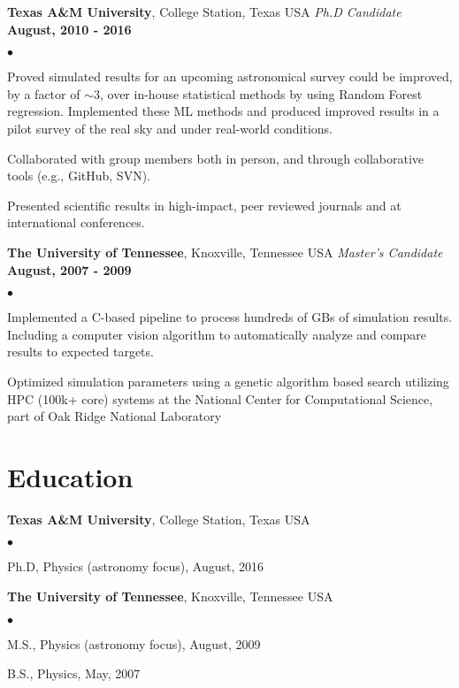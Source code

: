 \documentclass[margin,line, 11pt]{res}
\newenvironment{list2}{
  \begin{list}{$\bullet$}{%
      \setlength{\itemsep}{0in}
      \setlength{\parsep}{0in} \setlength{\parskip}{0in}
      \setlength{\topsep}{0in} \setlength{\partopsep}{0in}
      \setlength{\leftmargin}{0.2in}}}{\end{list}}
\begin{document}
\begin{resume}
\textbf{Texas A\&M University}, College Station, Texas USA\newline
\textit{Ph.D Candidate} \hfill \textbf{August, 2010 - 2016}\newline
    \begin{list2}
    	\vspace*{-5mm}
      \item Proved simulated results for an upcoming astronomical survey could be improved, by a factor of $\sim3$, over in-house statistical methods by using Random Forest regression. Implemented these ML methods and produced improved results in a pilot survey of the real sky and under real-world conditions.
    	\item Collaborated with group members both in person, and through collaborative tools (e.g., GitHub, SVN).
    	\item Presented scientific results in high-impact, peer reviewed journals and at international conferences.
    \end{list2}
\vspace*{-3mm}

\textbf{The University of Tennessee}, Knoxville, Tennessee USA\newline
\textit{Master's Candidate} \hfill \textbf{August, 2007 - 2009}\newline
    \begin{list2}
    	\vspace*{-5mm}
      \item Implemented a C-based pipeline to process hundreds of GBs of simulation results. Including a computer vision algorithm to automatically analyze and compare results to expected targets.
      \item Optimized simulation parameters using a genetic algorithm based search utilizing HPC (100k+ core) systems at the National Center for Computational Science, part of Oak Ridge National Laboratory
    \end{list2}
\vspace*{-3mm}

\section{Education}
\textbf{Texas A\&M University}, College Station, Texas USA\\
\vspace*{-4mm}
\begin{list2}
	\item Ph.D, Physics (astronomy focus), August, 2016
\end{list2}
\vspace*{-4mm}

\textbf{The University of Tennessee}, Knoxville, Tennessee USA\\
\vspace*{-4mm}
\begin{list2}
	\item M.S., Physics (astronomy focus),  August, 2009
	\item B.S., Physics,  May, 2007
\end{list2}
\vspace*{-2.5mm}

\end{resume}
\end{document}
